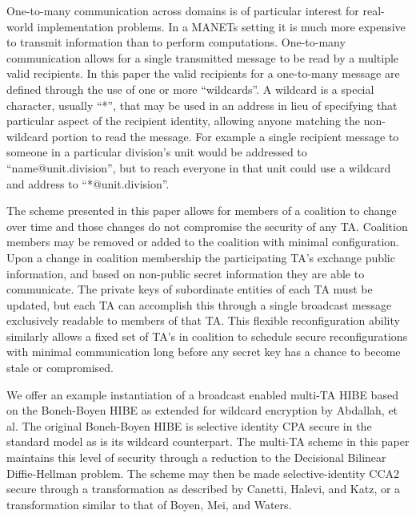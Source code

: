 \documentclass[10pt]{llncs}
\begin{document}
One-to-many communication across domains is of particular interest for real-world implementation problems. In a MANETs setting it is much more expensive to transmit information than to perform computations. One-to-many communication allows for a single transmitted message to be read by a multiple valid recipients. In this paper the valid recipients for a one-to-many message are defined through the use of one or more ``wildcards''. A wildcard is a special character, usually ``*'', that may be used in an address in lieu of specifying that particular aspect of the recipient identity, allowing anyone matching the non-wildcard portion to read the message. For example a single recipient message to someone in a particular division's unit would be addressed to ``name@unit.division'', but to reach everyone in that unit could use a wildcard and address to ``*@unit.division''.

The scheme presented in this paper allows for members of a coalition to change over time and those changes do not compromise the security of any TA. Coalition members may be removed or added to the coalition with minimal configuration. Upon a change in coalition membership the participating TA’s exchange public information, and based on non-public secret information they are able to communicate. The private keys of subordinate entities of each TA must be updated, but each TA can accomplish this through a single broadcast message exclusively readable to members of that TA. This flexible reconfiguration ability similarly allows a fixed set of TA’s in coalition to schedule secure reconfigurations with minimal communication long before any secret key has a chance to become stale or compromised.

We offer an example instantiation of a broadcast enabled multi-TA HIBE based on the Boneh-Boyen HIBE as extended for wildcard encryption by Abdallah, et al. The original Boneh-Boyen HIBE is selective identity CPA secure in the standard model as is its wildcard counterpart. The multi-TA scheme in this paper maintains this level of security through a reduction to the Decisional Bilinear Diffie-Hellman problem. The scheme may then be made selective-identity CCA2 secure through a transformation as described by Canetti, Halevi, and Katz, or a transformation similar to that of Boyen, Mei, and Waters.
\end{document}
